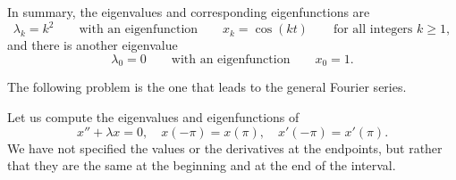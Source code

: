 \documentclass{ximera}
\begin{document}
\begin{exampleSol}
    In summary, the eigenvalues and corresponding eigenfunctions are
    \begin{equation*}
        \lambda_k = k^2 \qquad \text{with an eigenfunction} \qquad x_k = \cos (k t) \qquad \text{for all integers } k \geq 1 ,
    \end{equation*}
    and there is another eigenvalue
    \begin{equation*}
        \lambda_0 = 0 \qquad \text{with an eigenfunction} \qquad x_0 = 1.
    \end{equation*}
\end{exampleSol}

The following problem is the one that leads to the general Fourier
series.

\begin{example} \label{bvp-periodic:example}
    Let us compute the eigenvalues and eigenfunctions of
    \begin{equation*}
        x'' + \lambda x = 0, \quad x(-\pi) = x(\pi), \quad x'(-\pi) = x'(\pi) .
    \end{equation*}
    We have not specified the values or the derivatives at the endpoints, but rather that they are the same at the beginning and at the end of the interval.
\end{example}
\end{document}
